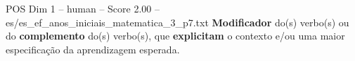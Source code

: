\begin{textsample}{POS Dim 1 – human – Score 2.00 – es/es\_ef\_anos\_iniciais\_matematica\_3\_p7.txt}  \label{ex:f1_pos_009}
\textbf{Modificador} do(s) verbo(s) ou do \textbf{complemento} do(s) verbo(s), que \textbf{explicitam} o contexto e/ou uma maior especificação da aprendizagem esperada.

\end{textsample}
